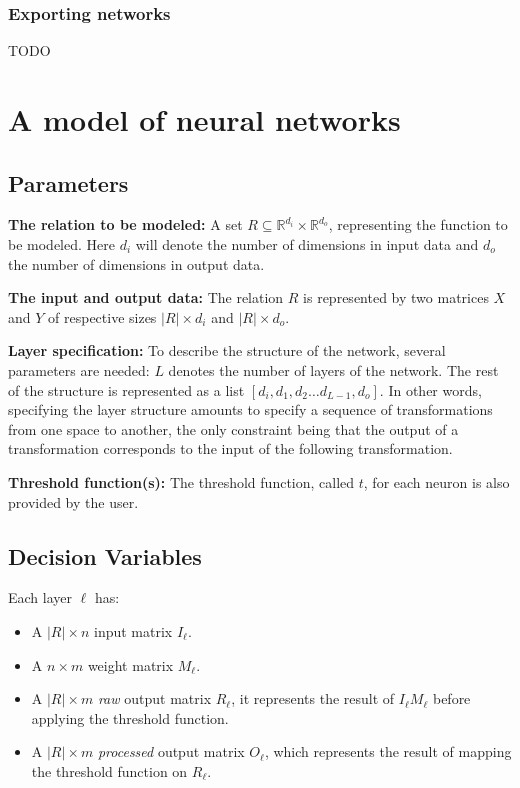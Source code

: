 \documentclass[a4paper, 10pt]{article}
\begin{document}
\subsubsection*{Exporting networks}
TODO

\section{A model of neural networks}

\subsection*{Parameters}

\begin{description}
    \item{\textbf{The relation to be modeled:}} A set $R \subseteq
        \mathbb{R}^{d_i} \times \mathbb{R}^{d_o}$, representing the function to be modeled.
        Here $d_i$ will denote the number of dimensions in input data and $d_o$
        the number of dimensions in output data.
    \item{\textbf{The input and output data:}} The relation $R$ is represented
        by two matrices $X$ and $Y$ of respective sizes $|R| \times d_i$ and $|R| \times
        d_o$. 
    \item{\textbf{Layer specification:}} To describe the structure of the network,
        several parameters are needed: $L$ denotes the number of layers of the
        network.  The rest of the structure is represented as a list $[d_i, d_1, d_2 \dots
        d_{L-1}, d_o]$. In other words, specifying the layer structure amounts to
        specify a sequence of transformations from one
        space to another, the only constraint being that the output of a
        transformation corresponds to the input of the following transformation.
        
    \item{\textbf{Threshold function(s):}} The threshold function, called $t$, for each neuron
        is also provided by the user. 
\end{description}

\subsection*{Decision Variables}
Each layer $\ell$ has: 
\begin{itemize}
    \item A $|R| \times n$ input matrix $I_\ell$.
    \item A $n \times m$  weight matrix $M_\ell$. 
    \item A $|R| \times m$ \emph{raw} output matrix $R_\ell$, it represents the
        result of $I_\ell M_\ell$ before applying the threshold function.
    \item A $|R| \times m$ \emph{processed} output matrix $O_\ell$, which represents the
        result of mapping the threshold function on $R_\ell$.
\end{itemize}
\end{document}
